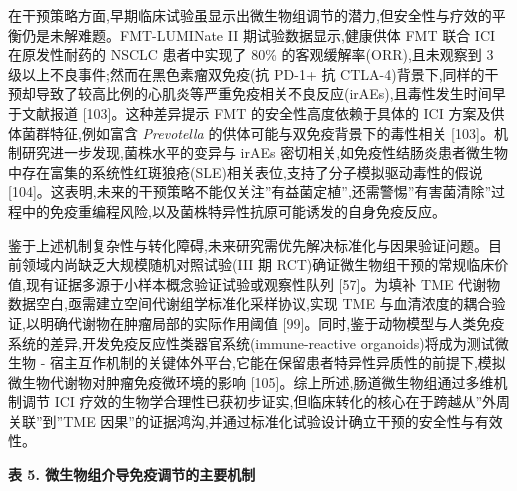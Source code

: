 在干预策略方面,早期临床试验虽显示出微生物组调节的潜力,但安全性与疗效的平衡仍是未解难题。FMT-LUMINate II 期试验数据显示,健康供体 FMT 联合 ICI 在原发性耐药的 NSCLC 患者中实现了 80\% 的客观缓解率(ORR),且未观察到 3 级以上不良事件;然而在黑色素瘤双免疫(抗 PD-1+ 抗 CTLA-4)背景下,同样的干预却导致了较高比例的心肌炎等严重免疫相关不良反应(irAEs),且毒性发生时间早于文献报道 {[}103{]}。这种差异提示 FMT 的安全性高度依赖于具体的 ICI 方案及供体菌群特征,例如富含 \emph{Prevotella} 的供体可能与双免疫背景下的毒性相关 {[}103{]}。机制研究进一步发现,菌株水平的变异与 irAEs 密切相关,如免疫性结肠炎患者微生物中存在富集的系统性红斑狼疮(SLE)相关表位,支持了分子模拟驱动毒性的假说 {[}104{]}。这表明,未来的干预策略不能仅关注''有益菌定植'',还需警惕''有害菌清除''过程中的免疫重编程风险,以及菌株特异性抗原可能诱发的自身免疫反应。

鉴于上述机制复杂性与转化障碍,未来研究需优先解决标准化与因果验证问题。目前领域内尚缺乏大规模随机对照试验(III 期 RCT)确证微生物组干预的常规临床价值,现有证据多源于小样本概念验证试验或观察性队列 {[}57{]}。为填补 TME 代谢物数据空白,亟需建立空间代谢组学标准化采样协议,实现 TME 与血清浓度的耦合验证,以明确代谢物在肿瘤局部的实际作用阈值 {[}99{]}。同时,鉴于动物模型与人类免疫系统的差异,开发免疫反应性类器官系统(immune-reactive organoids)将成为测试微生物 - 宿主互作机制的关键体外平台,它能在保留患者特异性异质性的前提下,模拟微生物代谢物对肿瘤免疫微环境的影响 {[}105{]}。综上所述,肠道微生物组通过多维机制调节 ICI 疗效的生物学合理性已获初步证实,但临床转化的核心在于跨越从''外周关联''到''TME 因果''的证据鸿沟,并通过标准化试验设计确立干预的安全性与有效性。

\textbf{表 5. 微生物组介导免疫调节的主要机制}

